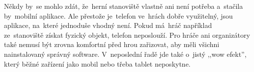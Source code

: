 Někdy by~se mohlo zdát, že~herní stanoviště vlastně ani není potřeba a~stačila by~mobilní aplikace.
Ale přestože je~telefon ve~hrách dobře využitelný, jsou aplikace, na~které jednoduše vhodný není.
Pokud má~hráč například ze~stanoviště získat fyzický objekt, telefon neposlouží.
Pro hráče ani organizátory také nemusí být zrovna komfortní před hrou zařizovat, aby měli všichni nainstalovaný správný software.
V~neposlední řadě jde také o~jistý ,,wow efekt'', který běžné zařízení jako mobil nebo třeba tablet neposkytne. %

